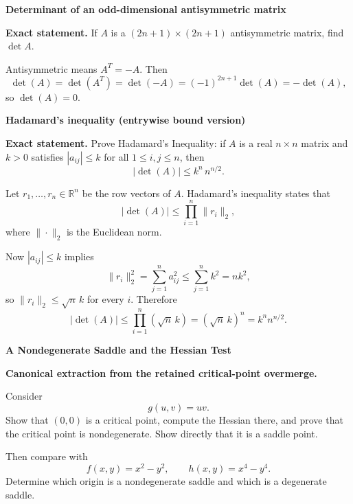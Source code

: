 \begin{problem}[CP-I-0027]
\label{prob:cp-i-0027}
\textbf{Determinant of an odd-dimensional antisymmetric matrix}

\textbf{Exact statement.}
\hspace*{1.5em}If \(A\) is a \((2n+1)\times(2n+1)\) antisymmetric matrix, find \(\det A\).

\end{problem}

\begin{solution}
Antisymmetric means \(A^T=-A\). Then
\[
\det(A)=\det(A^T)=\det(-A)=(-1)^{2n+1}\det(A)=-\det(A),
\]
so \(\det(A)=0\).
\end{solution}

\begin{problem}[CP-I-0028]
\label{prob:cp-i-0028}
\textbf{Hadamard's inequality (entrywise bound version)}

\textbf{Exact statement.}
\hspace*{1.5em}Prove Hadamard's Inequality: if $A$ is a real $n\times n$ matrix and $k>0$ satisfies $|a_{ij}|\le k$ for all $1\le i,j\le n$, then
\[
|\det(A)|\le k^n\,n^{n/2}.
\]
\end{problem}

\begin{solution}
Let $r_1,\dots,r_n\in\mathbb R^n$ be the row vectors of $A$.
Hadamard's inequality states that
\[
|\det(A)|\le \prod_{i=1}^n \|r_i\|_2,
\]
where $\|\cdot\|_2$ is the Euclidean norm.

Now $|a_{ij}|\le k$ implies
\[
\|r_i\|_2^2=\sum_{j=1}^n a_{ij}^2 \le \sum_{j=1}^n k^2 = nk^2,
\]
so $\|r_i\|_2\le \sqrt n\,k$ for every $i$.
Therefore
\[
|\det(A)|
\le \prod_{i=1}^n (\sqrt n\,k)
=(\sqrt n\,k)^n
=k^n n^{n/2}.
\]
\end{solution}

\begin{problem}[CP-I-0029]
\label{prob:cp-i-0029}
\textbf{A Nondegenerate Saddle and the Hessian Test}

\textbf{Canonical extraction from the retained critical-point overmerge.}

\hspace*{1.5em}Consider
\[
g(u,v)=uv.
\]
Show that \((0,0)\) is a critical point, compute the Hessian there, and prove that the critical
point is nondegenerate. Show directly that it is a saddle point.

Then compare with
\[
f(x,y)=x^2-y^2,
\qquad
h(x,y)=x^4-y^4.
\]
Determine which origin is a nondegenerate saddle and which is a degenerate saddle.
\end{problem}

